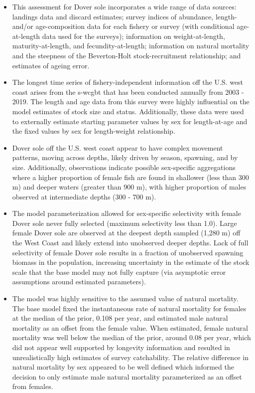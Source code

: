 \documentclass[11pt,
  english,
  a4paper,
]{article}
\begin{document}
\begin{itemize}

\item This assessment for Dover sole incorporates a wide range of data sources: landings data and discard estimates; survey indices of abundance, length- and/or age-composition data for each fishery or survey (with conditional age-at-length data used for the surveys); information on weight-at-length, maturity-at-length, and fecundity-at-length; information on natural mortality and the steepness of the Beverton-Holt stock-recruitment relationship; and estimates of ageing error.

\item The longest time series of fishery-independent information off the U.S. west coast arises from the \gls{s-wcgbt} that has been conducted annually from 2003 - 2019. The length and age data from this survey were highly influential on the model estimates of stock size and status. Additionally, these data were used to externally estimate starting parameter values by sex for length-at-age and the fixed values by sex for length-weight relationship.   

\item Dover sole off the U.S. west coast appear to have complex movement patterns, moving across depths, likely driven by season, spawning, and by size. Additionally, observations indicate possible sex-specific aggregations where a higher proportion of female fish are found in shallower (less than 300 m) and deeper waters (greater than 900 m), with higher proportion of males observed at intermediate depths (300 - 700 m).

\item The model parameterization allowed for sex-specific selectivity with female Dover sole never fully selected (maximum selectivity less than 1.0). Large female Dover sole are observed at the deepest depth sampled (1,280 m) off the West Coast and likely extend into unobserved deeper depths. Lack of full selectivity of female Dover sole results in a fraction of unobserved spawning biomass in the population, increasing uncertainty in the estimate of the stock scale that the base model may not fully capture (via asymptotic error assumptions around estimated parameters).  

\item The model was highly sensitive to the assumed value of natural mortality.  The base model fixed the instantaneous rate of natural mortality for females at the median of the prior, 0.108 per year, and estimated male natural mortality as an offset from the female value. When estimated, female natural mortality was well below the median of the prior, around 0.08 per year, which did not appear well supported by longevity information and resulted in unrealistically high estimates of survey catchability.  The relative difference in natural mortality by sex appeared to be well defined which informed the decision to only estimate male natural mortality parameterized as an offset from females.   


\end{itemize}
\end{document}
